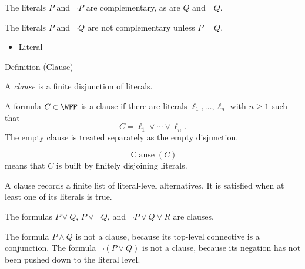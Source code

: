 \begin{remark*}[Examples]
The literals \(P\) and \(\neg P\) are complementary, as are \(Q\) and
\(\neg Q\).
\end{remark*}

\begin{remark*}
The literals \(P\) and \(\neg Q\) are not complementary unless \(P=Q\).
\end{remark*}

\begin{dependencies}
\begin{itemize}
  \item \hyperref[def:literal-propositional-logic]{Literal}
\end{itemize}
\end{dependencies}

\begin{definitionbox}{Definition (Clause)}
\begin{definition}[Clause]
\label{def:clause-propositional-logic}
A \emph{clause} is a finite disjunction of literals.
\end{definition}
\end{definitionbox}

\begin{remark*}
A formula \(C\in\WFF\) is a clause if there are literals
\(\ell_1,\ldots,\ell_n\) with \(n\ge 1\) such that
\[
C=\ell_1\lor\cdots\lor\ell_n.
\]
The empty clause is treated separately as the empty disjunction.
\end{remark*}

\begin{remark*}
\[
\operatorname{Clause}(C)
\]
means that \(C\) is built by finitely disjoining literals.
\end{remark*}

\begin{remark*}[Interpretation]
A clause records a finite list of literal-level alternatives. It is satisfied
when at least one of its literals is true.
\end{remark*}

\begin{remark*}[Examples]
The formulas \(P\lor Q\), \(P\lor\neg Q\), and
\(\neg P\lor Q\lor R\) are clauses.
\end{remark*}

\begin{remark*}
The formula \(P\land Q\) is not a clause, because its top-level connective is a
conjunction. The formula \(\neg(P\lor Q)\) is not a clause, because its negation
has not been pushed down to the literal level.
\end{remark*}

